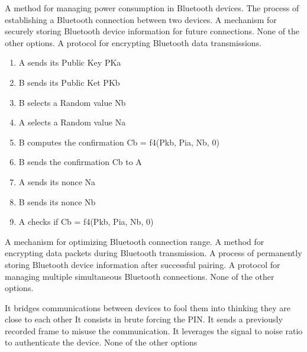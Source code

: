 \begin{checkboxes}
    \choice A method for managing power consumption in Bluetooth devices.
    \CorrectChoice The process of establishing a Bluetooth connection between two devices.
    \choice A mechanism for securely storing Bluetooth device information for future connections.
    \choice None of the other options.
    \choice A protocol for encrypting Bluetooth data transmissions.
\end{checkboxes}


\begin{solution}
    \begin{enumerate}
        \item A sends its Public Key PKa
        \item B sends its Public Ket PKb
        \item B selects a Random value Nb
        \item A selects a Random value Na
        \item B computes the confirmation Cb = f4(Pkb, Pia, Nb, 0)
        \item B sends the confirmation Cb to A
        \item A sends its nonce Na
        \item B sends its nonce Nb
        \item A checks if Cb = f4(Pkb, Pia, Nb, 0)
    \end{enumerate}
\end{solution}

\begin{checkboxes}
    \choice A mechanism for optimizing Bluetooth connection range.
    \choice A method for encrypting data packets during Bluetooth transmission.
    \CorrectChoice A process of permanently storing Bluetooth device information after successful pairing.
    \choice A protocol for managing multiple simultaneous Bluetooth connections.
    \choice None of the other options.
\end{checkboxes}

\begin{checkboxes}
    \CorrectChoice It bridges communications between devices to fool them into thinking they are close to each other
    \choice It consists in brute forcing the PIN.
    \choice It sends a previously recorded frame to misuse the communication.
    \choice It leverages the signal to noise ratio to authenticate the device.
    \choice None of the other options
\end{checkboxes}

